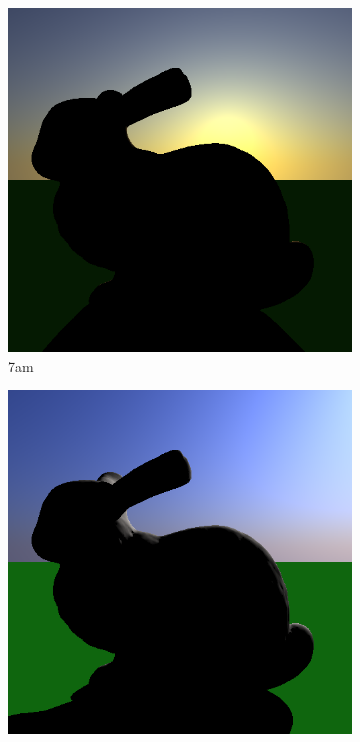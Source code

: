 \begin{figure}[h]
	\centering
	\begin{subfigure}[b]{0.3\textwidth}
		\includegraphics[width=\textwidth]{week2/2/bunny_7.png}
		\caption{7am}
		\label{fig:skylight7}
	\end{subfigure}
	\begin{subfigure}[b]{0.3\textwidth}
		\includegraphics[width=\textwidth]{week2/2/bunny_9.png}

\end{subfigure}
\end{figure}
